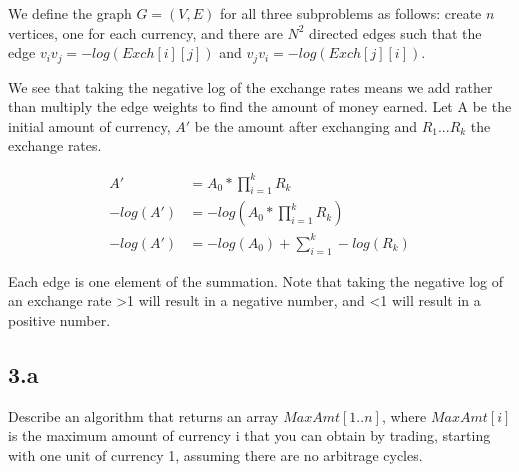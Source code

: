 \documentclass[11pt]{article}
\begin{document}




We define the graph $G=(V,E)$ for all three subproblems as follows: create $n$ vertices, one for each currency, and there are $N^2$ directed edges such that the edge $v_i v_j = -log(Exch[i][j])$ and $v_j v_i = -log(Exch[j][i])$. 

We see that taking the negative log of the exchange rates means we add rather than multiply the edge weights to find the amount of money earned. Let A be the initial amount of currency, $A'$ be the amount after exchanging and $R_1...R_k$ the exchange rates.

\begin{align*}
A' &= A_0 * \prod_{i=1}^{k} R_k \\
-log(A') &= -log ( A_0 * \prod_{i=1}^{k} R_k ) \\
-log(A') &= -log(A_0) + \sum_{i=1}^{k} -log(R_k)
\end{align*}

Each edge is one element of the summation. Note that taking the negative log of an exchange rate >1 will result in a negative number, and <1 will result in a positive number. 
 
\subsection *{3.a} Describe an algorithm that returns an array $MaxAmt[1 .. n]$, where $MaxAmt[i]$ is the maximum amount of currency i that you can obtain  by trading, starting with one unit of currency 1, assuming there are no arbitrage cycles.
\end{document}
